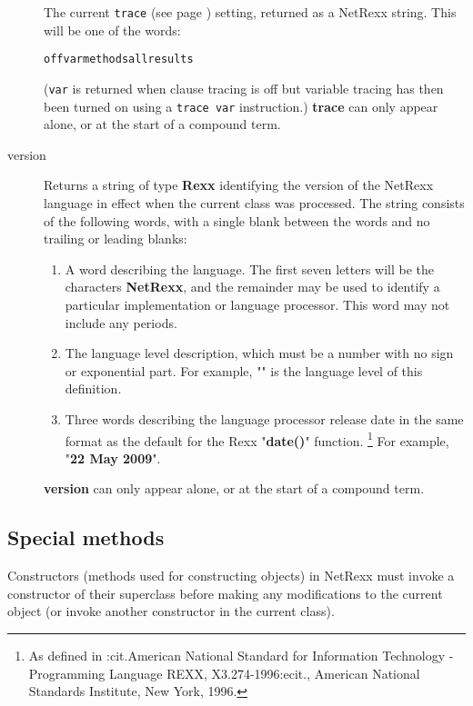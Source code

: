 \begin{description}
The current  \texttt{trace} (see page \pageref{reftrace})  setting,
returned as a NetRexx string.
This will be one of the words:
\begin{alltt}
off var methods all results
\end{alltt}

(\texttt{var} is returned when clause tracing is off but variable
tracing has then been turned on using a \texttt{trace var} instruction.)
 \textbf{trace} can only appear alone, or at the start of a
compound term.
\item[version]\label{refswvers}
 
Returns a string of type \textbf{Rexx} identifying the version of the
NetRexx language in effect when the current class was processed.
The string consists of the following words, with a single blank between
the words and no trailing or leading blanks:
\begin{enumerate}
\item A word describing the language.  The first seven letters will be the
characters \textbf{NetRexx}, and the remainder may be used to identify
a particular implementation or language processor.
This word may not include any periods.
\item 
The language level description, which must be a number with no sign or
exponential part.
For example, "\textbf{\nrversion{}}" is the language level of this
definition.
\item 
Three words describing the language processor release date in
the same format as the default for the Rexx "\textbf{date()}"
function.
\footnote{
As defined in :cit.American National Standard for Information
Technology - Programming Language REXX, X3.274-1996:ecit., American
National Standards Institute, New York, 1996.
}
For example, "\textbf{22 May 2009}".
\end{enumerate}
 \textbf{version} can only appear alone, or at the start of a
compound term.
\end{description}
\subsection{Special methods}\label{"id"}
 
Constructors (methods used for constructing objects) in NetRexx
must invoke a constructor of their superclass before making any
modifications to the current object (or invoke another constructor in
the current class).
 
